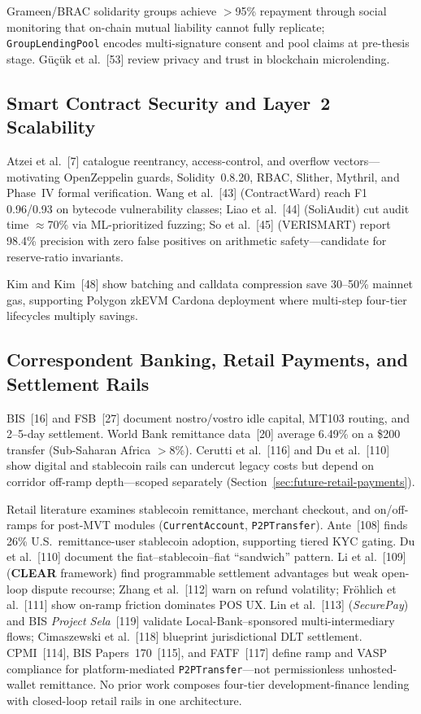 \documentclass[12pt, a4paper]{report}
\begin{document}
Grameen/BRAC solidarity groups achieve $>$95\% repayment through social monitoring that on-chain mutual liability cannot fully replicate; \texttt{GroupLendingPool} encodes multi-signature consent and pool claims at pre-thesis stage. G\"{u}\c{c}\"uk et al.~[53] review privacy and trust in blockchain microlending.

\subsection{Smart Contract Security and Layer~2 Scalability}

Atzei et al.~[7] catalogue reentrancy, access-control, and overflow vectors---motivating OpenZeppelin guards, Solidity~0.8.20, RBAC, Slither, Mythril, and Phase~IV formal verification. Wang et al.~[43] (ContractWard) reach F1 0.96/0.93 on bytecode vulnerability classes; Liao et al.~[44] (SoliAudit) cut audit time $\approx$70\% via ML-prioritized fuzzing; So et al.~[45] (VERISMART) report 98.4\% precision with zero false positives on arithmetic safety---candidate for reserve-ratio invariants.

Kim and Kim~[48] show batching and calldata compression save 30--50\% mainnet gas, supporting Polygon zkEVM Cardona deployment where multi-step four-tier lifecycles multiply savings.

\subsection{Correspondent Banking, Retail Payments, and Settlement Rails}
\label{sec:lit-retail-payments}

BIS~[16] and FSB~[27] document nostro/vostro idle capital, MT103 routing, and 2--5-day settlement. World Bank remittance data~[20] average 6.49\% on a \$200 transfer (Sub-Saharan Africa $>$8\%). Cerutti et al.~[116] and Du et al.~[110] show digital and stablecoin rails can undercut legacy costs but depend on corridor off-ramp depth---scoped separately (Section~\ref{sec:future-retail-payments}).

Retail literature examines stablecoin remittance, merchant checkout, and on/off-ramps for post-MVT modules (\texttt{CurrentAccount}, \texttt{P2PTransfer}). Ante~[108] finds 26\% U.S.\ remittance-user stablecoin adoption, supporting tiered KYC gating. Du et al.~[110] document the fiat--stablecoin--fiat ``sandwich'' pattern. Li et al.~[109] (\textbf{CLEAR} framework) find programmable settlement advantages but weak open-loop dispute recourse; Zhang et al.~[112] warn on refund volatility; Fr\"{o}hlich et al.~[111] show on-ramp friction dominates POS UX. Lin et al.~[113] (\textit{SecurePay}) and BIS \textit{Project Sela}~[119] validate Local-Bank--sponsored multi-intermediary flows; Cimaszewski et al.~[118] blueprint jurisdictional DLT settlement. CPMI~[114], BIS Papers~170~[115], and FATF~[117] define ramp and VASP compliance for platform-mediated \texttt{P2PTransfer}---not permissionless unhosted-wallet remittance. No prior work composes four-tier development-finance lending with closed-loop retail rails in one architecture.
\end{document}
